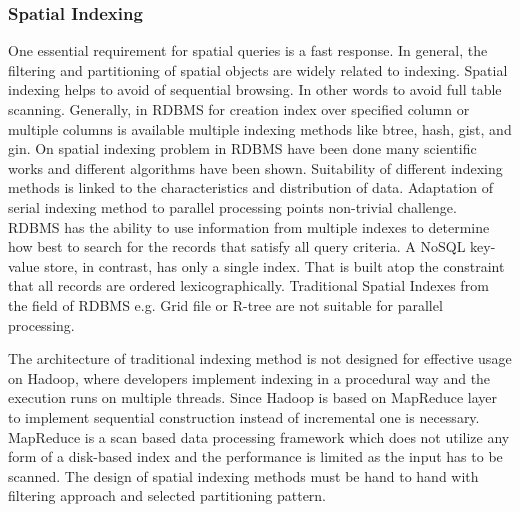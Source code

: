 \documentclass[a4paper,12pt,oneside]{report}
\begin{document}
	
	
	\subsubsection{Spatial Indexing}
	\label{Spatial_Indexing}
	One essential requirement for spatial queries is a fast response. 
	In general, the filtering and partitioning  of spatial objects are widely
	related to indexing. 
	Spatial indexing helps to avoid of sequential browsing. In other words to avoid
	full table scanning.
	Generally, in RDBMS for creation index over specified column or multiple columns
	is available multiple 
	indexing methods like btree, hash, gist, and gin. On spatial indexing problem in
	RDBMS have 
	been done many scientific works and different algorithms have been shown.
	Suitability of 
	different indexing methods is linked to the characteristics and distribution of
	data. 
	Adaptation of serial indexing method to parallel processing points non-trivial
	challenge. 
	RDBMS has the ability to use information from multiple indexes to determine how
	best
	to search for the records that satisfy all query criteria. A
	NoSQL key-value store, in contrast, has only a single index.
	That is built atop the constraint that all records are ordered
	lexicographically. Traditional 
	Spatial Indexes from the field of RDBMS e.g. Grid file or R-tree are not
	suitable for parallel 
	processing. 
	
	The architecture of traditional indexing method is not designed for
	effective 	usage on Hadoop, where developers implement indexing in a 
	procedural way and the execution  runs on multiple threads.
	 Since Hadoop is based on MapReduce layer to implement 
	sequential construction instead of incremental one  is necessary.  
	MapReduce is a scan based data processing framework which does not utilize any
	form of a disk-based 
	index and the performance is limited as the input has to be scanned. The design
	of spatial indexing methods 
	must be hand to hand with filtering approach and selected partitioning pattern. 
	
	
\end{document}
